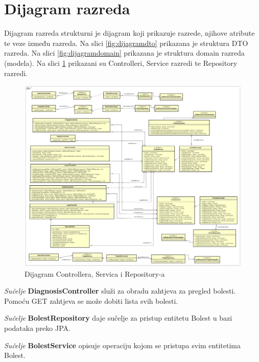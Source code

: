 			\eject
			
			
		\section{Dijagram razreda}
			
			Dijagram razreda strukturni je dijagram koji prikazuje razrede, njihove atribute te veze između razreda. Na slici \ref{fig:dijagramdto} prikazana je struktura DTO razreda. Na slici \ref{fig:dijagramdomain} prikazana je struktura domain razreda (modela). Na slici \ref{fig:dijagramcontroll} prikazani su Controlleri, Service razredi te Repository razredi.
			
			
			\begin{figure}[H]
				\includegraphics[width=\textwidth]{dijagrami/Class Diagram3.png} %
				\caption{Dijagram Controllera, Servica i Repository-a}
				\label{fig:dijagramcontroll} %
			\end{figure}
			
			\textit{Sučelje }\textbf{DiagnosisController}
			služi za obradu zahtjeva za pregled bolesti. Pomoću GET zahtjeva se može dobiti lista svih bolesti.
			
			\textit{Sučelje }\textbf{BolestRepository}
			 daje sučelje za pristup entitetu Bolest u bazi podataka preko JPA.
			
			\textit{Sučelje }\textbf{BolestService}
			 opisuje operaciju kojom se pristupa svim entitetima Bolest.
			
